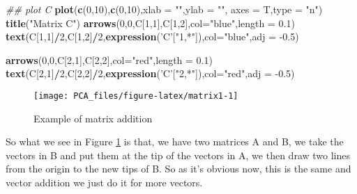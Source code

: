 \documentclass[
]{book}
\newenvironment{Shaded}{\begin{snugshade}}{\end{snugshade}}
\newcommand{\CommentTok}[1]{\textcolor[rgb]{0.56,0.35,0.01}{\textit{#1}}}
\newcommand{\DataTypeTok}[1]{\textcolor[rgb]{0.13,0.29,0.53}{#1}}
\newcommand{\DecValTok}[1]{\textcolor[rgb]{0.00,0.00,0.81}{#1}}
\newcommand{\FloatTok}[1]{\textcolor[rgb]{0.00,0.00,0.81}{#1}}
\newcommand{\KeywordTok}[1]{\textcolor[rgb]{0.13,0.29,0.53}{\textbf{#1}}}
\newcommand{\NormalTok}[1]{#1}
\newcommand{\OperatorTok}[1]{\textcolor[rgb]{0.81,0.36,0.00}{\textbf{#1}}}
\newcommand{\StringTok}[1]{\textcolor[rgb]{0.31,0.60,0.02}{#1}}
\theoremstyle{definition}
\theoremstyle{definition}
\theoremstyle{definition}
\theoremstyle{remark}
\begin{document}
\begin{Shaded}
\begin{Highlighting}[]
\CommentTok{## plot C}
\KeywordTok{plot}\NormalTok{(}\KeywordTok{c}\NormalTok{(}\DecValTok{0}\NormalTok{,}\DecValTok{10}\NormalTok{),}\KeywordTok{c}\NormalTok{(}\DecValTok{0}\NormalTok{,}\DecValTok{10}\NormalTok{),}\DataTypeTok{xlab =} \StringTok{""}\NormalTok{,}\DataTypeTok{ylab =} \StringTok{""}\NormalTok{,}
 \DataTypeTok{axes =}\NormalTok{ T,}\DataTypeTok{type =} \StringTok{"n"}\NormalTok{)}
\KeywordTok{title}\NormalTok{(}\StringTok{"Matrix C"}\NormalTok{)}
\KeywordTok{arrows}\NormalTok{(}\DecValTok{0}\NormalTok{,}\DecValTok{0}\NormalTok{,C[}\DecValTok{1}\NormalTok{,}\DecValTok{1}\NormalTok{],C[}\DecValTok{1}\NormalTok{,}\DecValTok{2}\NormalTok{],}\DataTypeTok{col=}\StringTok{"blue"}\NormalTok{,}\DataTypeTok{length =} \FloatTok{0.1}\NormalTok{)}
\KeywordTok{text}\NormalTok{(C[}\DecValTok{1}\NormalTok{,}\DecValTok{1}\NormalTok{]}\OperatorTok{/}\DecValTok{2}\NormalTok{,C[}\DecValTok{1}\NormalTok{,}\DecValTok{2}\NormalTok{]}\OperatorTok{/}\DecValTok{2}\NormalTok{,}\KeywordTok{expression}\NormalTok{(}\StringTok{'C'}\NormalTok{[}\StringTok{"1,*"}\NormalTok{]),}\DataTypeTok{col=}\StringTok{"blue"}\NormalTok{,}\DataTypeTok{adj =} \FloatTok{-0.5}\NormalTok{)}

\KeywordTok{arrows}\NormalTok{(}\DecValTok{0}\NormalTok{,}\DecValTok{0}\NormalTok{,C[}\DecValTok{2}\NormalTok{,}\DecValTok{1}\NormalTok{],C[}\DecValTok{2}\NormalTok{,}\DecValTok{2}\NormalTok{],}\DataTypeTok{col=}\StringTok{"red"}\NormalTok{,}\DataTypeTok{length =} \FloatTok{0.1}\NormalTok{)}
\KeywordTok{text}\NormalTok{(C[}\DecValTok{2}\NormalTok{,}\DecValTok{1}\NormalTok{]}\OperatorTok{/}\DecValTok{2}\NormalTok{,C[}\DecValTok{2}\NormalTok{,}\DecValTok{2}\NormalTok{]}\OperatorTok{/}\DecValTok{2}\NormalTok{,}\KeywordTok{expression}\NormalTok{(}\StringTok{'C'}\NormalTok{[}\StringTok{"2,*"}\NormalTok{]),}\DataTypeTok{col=}\StringTok{"red"}\NormalTok{,}\DataTypeTok{adj =} \FloatTok{-0.5}\NormalTok{)}
\end{Highlighting}
\end{Shaded}

\begin{figure}

{\centering \texttt{[image: PCA\_files/figure-latex/matrix1-1]} 

}

\caption{Example of matrix addition}\label{fig:matrix1}
\end{figure}

So what we see in Figure \ref{fig:matrix1} is that, we have two matrices A and B, we take the vectors in B and put them at the tip of the vectors in A, we then draw two lines from the origin to the new tips of B. So as it's obvious now, this is the same and vector addition we just do it for more vectors.
\end{document}
